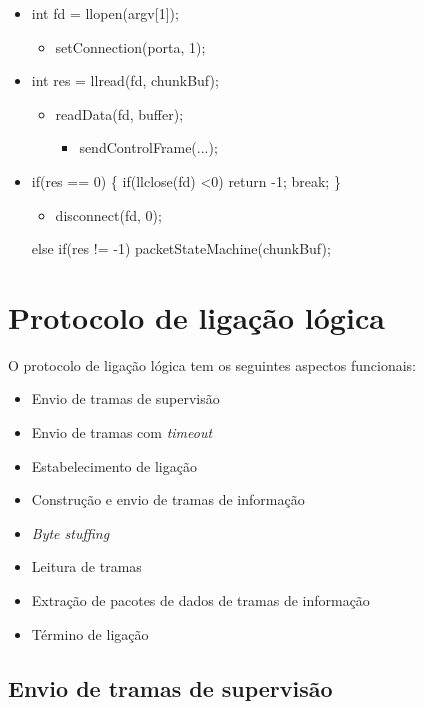 \documentclass[a4paper,11pt]{article}
\begin{document}
\begin{itemize}

\item int fd = llopen(argv[1]);
\begin{itemize}
\item setConnection(porta, 1);
\end{itemize}
\item int res = llread(fd, chunkBuf);
\begin{itemize}
\item readData(fd, buffer);
\begin{itemize}
\item sendControlFrame(...);
\end{itemize}
\end{itemize}
\item if(res == 0) 
                \{
                        if(llclose(fd) \textless 0)
                                return -1;
                        break;
                \}
                \begin{itemize}
\item disconnect(fd, 0);
\end{itemize}
                else if(res != -1) packetStateMachine(chunkBuf);
\end{itemize}

\section{Protocolo de ligação lógica}
O protocolo de ligação lógica tem os seguintes aspectos funcionais:
\begin{itemize}
  \item Envio de tramas de supervisão
  \item Envio de tramas com \textit{timeout}
  \item Estabelecimento de ligação
  \item Construção e envio de tramas de informação
  \item \textit{Byte stuffing}
  \item Leitura de tramas
  \item Extração de pacotes de dados de tramas de informação
  \item Término de ligação
\end{itemize}

\subsection{Envio de tramas de supervisão}
\end{document}

